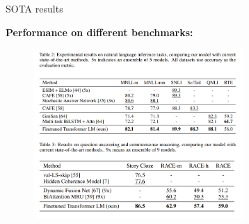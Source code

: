 
\begin{vbframe}{SOTA results}

\vfill

	\textbf{Performance on different benchmarks:}

	\begin{figure}
		\centering
		\includegraphics[width = 8cm]{figure/gpt-sota.png}\\ 
	\end{figure}

\vfill

\end{vbframe}


\endlecture

